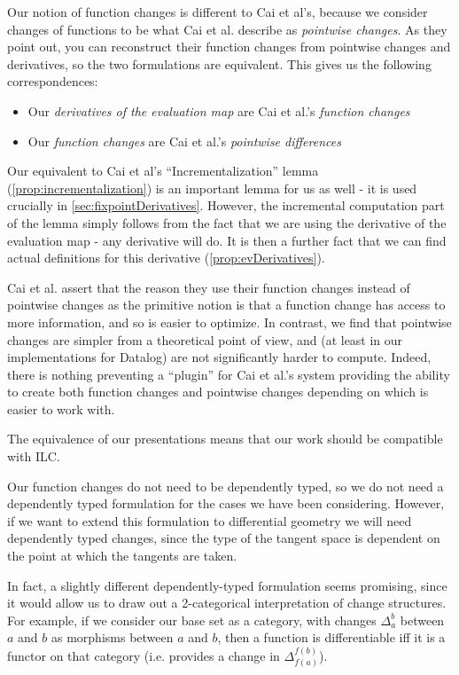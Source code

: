 Our notion of function changes is different to Cai et al's, because we consider changes of functions to be what Cai et al. describe as
\textit{pointwise changes}. As they point out, you can reconstruct their
function changes from pointwise changes and derivatives, so the two formulations
are equivalent. This gives us the following correspondences:
\begin{itemize}
  \item Our \textit{derivatives of the
      evaluation map} are Cai et al.'s \textit{function changes}
  \item Our \textit{function changes} are Cai et al.'s \textit{pointwise differences}
\end{itemize}

Our equivalent to Cai et al's ``Incrementalization'' lemma
(\ref{prop:incrementalization}) is an important lemma for us as well - it is used
crucially in \ref{sec:fixpointDerivatives}. However, the incremental computation part of
the lemma simply follows from the fact that we are using the derivative of the
evaluation map - any derivative will do. It is then a further fact that we can
find actual definitions for this derivative (\ref{prop:evDerivatives}).

Cai et al. assert that the reason they use their function changes instead of pointwise
changes as the primitive notion is that a function change has access to more
information, and so is easier to optimize. In contrast, we find that pointwise
changes are simpler from a theoretical point of view, and (at least in our
implementations for Datalog) are not significantly harder to compute. Indeed,
there is nothing preventing a ``plugin'' for Cai et al.'s system providing the
ability to create both function changes and pointwise changes depending on which
is easier to work with.

The equivalence of our presentations means that our work should be compatible
with ILC.

Our function changes do not need to be dependently typed, so we do not need a
dependently typed formulation for the cases we have been considering. However,
if we want to extend this formulation to differential geometry we will need
dependently typed changes, since the type of the tangent space is
dependent on the point at which the tangents are taken.

In fact, a slightly different dependently-typed formulation seems promising, since it would allow us
to draw out a 2-categorical interpretation of change structures. For example, if
we consider our base set as a category, with changes $\Delta_a^b$ between $a$
and $b$ as morphisms between $a$ and $b$, then a function is
differentiable iff it is a functor on that category (i.e. provides a change in
$\Delta_{f(a)}^{f(b)}$). 

